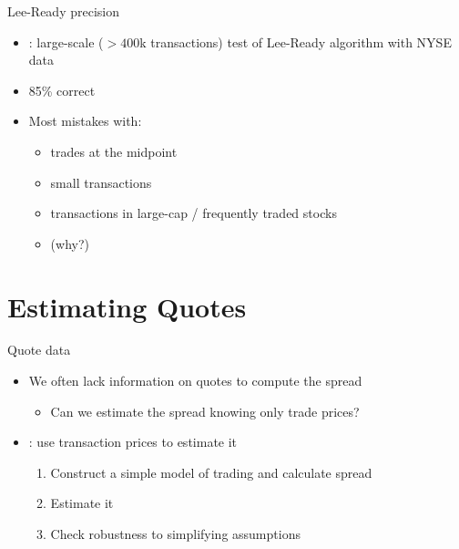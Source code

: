 \documentclass[english,10pt
,aspectratio=169
]{beamer}
\begin{document}
\begin{frame}{Lee-Ready precision}
	\begin{itemize}
		\item \citet{odders-white_occurrence_2000}: large-scale ($>400$k transactions) test of Lee-Ready algorithm with NYSE data
		\item 85\% correct
		\item Most mistakes with:
		\begin{itemize}
			\item trades at the midpoint
			\item small transactions
			\item transactions in large-cap / frequently traded stocks
			\item (why?)
		\end{itemize}
	\end{itemize}
\end{frame}



\section{Estimating Quotes}


\begin{frame}{Quote data}
	\begin{itemize}
		\item We often lack information on quotes to compute the spread
		\begin{itemize}
			\item Can we estimate the spread knowing only trade prices?
		\end{itemize}
		\item \citet{roll_simple_1984}: use transaction prices to estimate it
		\begin{enumerate}
			\item Construct a simple model of trading and calculate spread
			\item Estimate it
			\item Check robustness to simplifying assumptions
		\end{enumerate}
	\end{itemize}
\end{frame}
\end{document}

